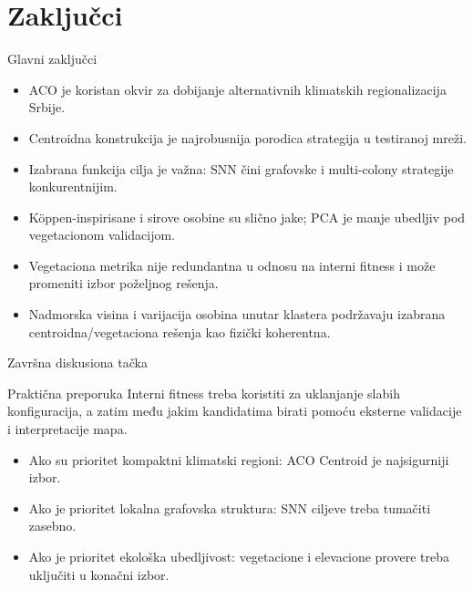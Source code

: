 \documentclass[aspectratio=169,10pt]{beamer}
\begin{document}
\section{Zaključci}

\begin{frame}{Glavni zaključci}
  \begin{itemize}
    \item ACO je koristan okvir za dobijanje alternativnih klimatskih regionalizacija Srbije.
    \item Centroidna konstrukcija je najrobusnija porodica strategija u testiranoj mreži.
    \item Izabrana funkcija cilja je važna: SNN čini grafovske i multi-colony strategije konkurentnijim.
    \item K\"oppen-inspirisane i sirove osobine su slično jake; PCA je manje ubedljiv pod vegetacionom validacijom.
    \item Vegetaciona metrika nije redundantna u odnosu na interni fitness i može promeniti izbor poželjnog rešenja.
    \item Nadmorska visina i varijacija osobina unutar klastera podržavaju izabrana centroidna/vegetaciona rešenja kao fizički koherentna.
  \end{itemize}
\end{frame}

\begin{frame}{Završna diskusiona tačka}
  \begin{block}{Praktična preporuka}
    Interni fitness treba koristiti za uklanjanje slabih konfiguracija, a zatim među jakim kandidatima birati pomoću eksterne validacije i interpretacije mapa.
  \end{block}

  \vspace{1em}
  \begin{itemize}
    \item Ako su prioritet kompaktni klimatski regioni: ACO Centroid je najsigurniji izbor.
    \item Ako je prioritet lokalna grafovska struktura: SNN ciljeve treba tumačiti zasebno.
    \item Ako je prioritet ekološka ubedljivost: vegetacione i elevacione provere treba uključiti u konačni izbor.
  \end{itemize}
\end{frame}
\end{document}

